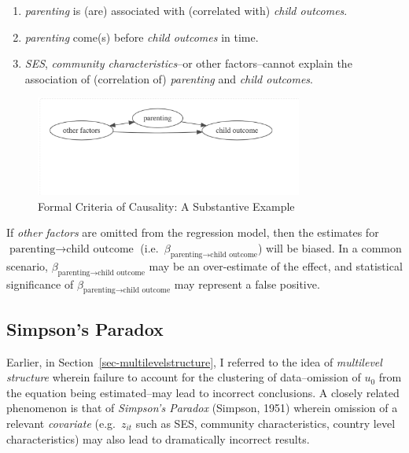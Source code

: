 \documentclass[
  letterpaper,
  DIV=11,
  numbers=noendperiod]{scrreprt}
\providecommand{\tightlist}{%
  \setlength{\itemsep}{0pt}\setlength{\parskip}{0pt}}\usepackage{longtable,booktabs,array}
\begin{document}
\begin{enumerate}
\def\labelenumi{\arabic{enumi}.}
\tightlist
\item
  \emph{parenting} is (are) associated with (correlated with)
  \emph{child outcomes}.
\item
  \emph{parenting} come(s) before \emph{child outcomes} in time.
\item
  \emph{SES}, \emph{community characteristics}--or other factors--cannot
  explain the association of (correlation of) \emph{parenting} and
  \emph{child outcomes}.
\end{enumerate}

\begin{figure}

{\centering \includegraphics[width=3.46in,height=\textheight]{fig-causalitysubstantive.png}

}

\caption{\label{fig-causalitysubstantive}Formal Criteria of Causality: A
Substantive Example}

\end{figure}

If \emph{other factors} are omitted from the regression model, then the
estimates for \(\text{parenting} \rightarrow \text{child outcome}\)
(i.e.~\(\beta_{\text{parenting} \rightarrow \text{child outcome}}\))
will be biased. In a common scenario,
\(\beta_{\text{parenting} \rightarrow \text{child outcome}}\) may be an
over-estimate of the effect, and statistical significance of
\(\beta_{\text{parenting} \rightarrow \text{child outcome}}\) may
represent a false positive.

\hypertarget{simpsons-paradox}{%
\subsection{Simpson's Paradox}\label{simpsons-paradox}}

Earlier, in Section~\ref{sec-multilevelstructure}, I referred to the
idea of \emph{multilevel structure} wherein failure to account for the
clustering of data--omission of \(u_0\) from the equation being
estimated--may lead to incorrect conclusions. A closely related
phenomenon is that of \emph{Simpson's Paradox} (Simpson, 1951) wherein
omission of a relevant \emph{covariate} (e.g.~\(z_{it}\) such as SES,
community characteristics, country level characteristics) may also lead
to dramatically incorrect results.
\end{document}
